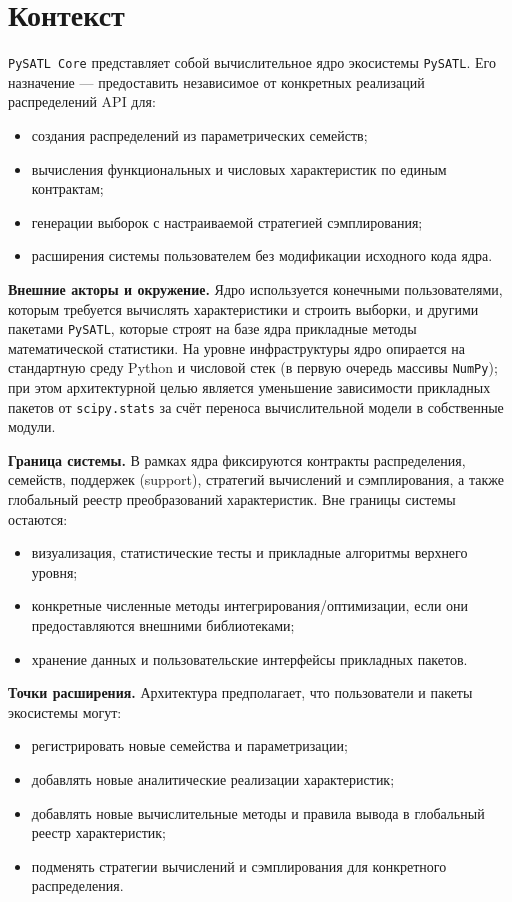 \section{Контекст}
\label{sec:context}

\texttt{PySATL Core} представляет собой вычислительное ядро экосистемы \texttt{PySATL}. Его назначение --- предоставить независимое от конкретных реализаций распределений API для:
\begin{itemize}[compact]
	\item создания распределений из параметрических семейств;
	\item вычисления функциональных и числовых характеристик по единым контрактам;
	\item генерации выборок с настраиваемой стратегией сэмплирования;
	\item расширения системы пользователем без модификации исходного кода ядра.
\end{itemize}

\textbf{Внешние акторы и окружение.}
Ядро используется конечными пользователями, которым требуется вычислять характеристики и строить выборки, и другими пакетами \texttt{PySATL}, которые строят на базе ядра прикладные методы математической статистики. На уровне инфраструктуры ядро опирается на стандартную среду Python и числовой стек (в первую очередь массивы \texttt{NumPy}); при этом архитектурной целью является уменьшение зависимости прикладных пакетов от \texttt{scipy.stats} за счёт переноса вычислительной модели в собственные модули.

\textbf{Граница системы.}
В рамках ядра фиксируются контракты распределения, семейств, поддержек (support), стратегий вычислений и сэмплирования, а также глобальный реестр преобразований характеристик. Вне границы системы остаются:
\begin{itemize}[compact]
	\item визуализация, статистические тесты и прикладные алгоритмы верхнего уровня;
	\item конкретные численные методы интегрирования/оптимизации, если они предоставляются внешними библиотеками;
	\item хранение данных и пользовательские интерфейсы прикладных пакетов.
\end{itemize}

\textbf{Точки расширения.}
Архитектура предполагает, что пользователи и пакеты экосистемы могут:
\begin{itemize}[compact]
	\item регистрировать новые семейства и параметризации;
	\item добавлять новые аналитические реализации характеристик;
	\item добавлять новые вычислительные методы и правила вывода в глобальный реестр характеристик;
	\item подменять стратегии вычислений и сэмплирования для конкретного распределения.
\end{itemize}
